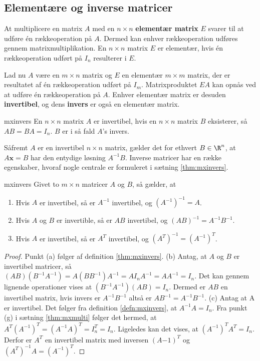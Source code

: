 \subsection{Elementære og inverse matricer}
At multiplicere en matrix $A$ med en $n \times n$ \textbf{elementær matrix} $E$ svarer til at udføre én rækkeoperation på $A$. 
Dermed kan enhver rækkeoperation udføres gennem matrixmultiplikation. 
En $n \times n$ matrix $E$ er elementær, hvis én rækkeoperation udført på $I_n$ resulterer i $E$. 

Lad nu $A$ være en $m \times n$ matrix og $E$ en elementær $m \times m$ matrix, der er resultatet af én rækkeoperation udført på $I_m$. 
Matrixproduktet $EA$ kan opnås ved at udføre én rækkeoperation på $A$. 
Enhver elementær matrix er desuden \textbf{invertibel}, og dens \textbf{invers} er også en elementær matrix. 
%
\begin{defn}{}{mxinvers}
En $n \times n$ matrix $A$ er invertibel, hvis en $n \times n$ matrix $B$ eksisterer, så $AB=BA=I_n$. $B$ er i så fald $A$'s invers. 
\end{defn}
Såfremt $A$ er en invertibel $n \times n$ matrix, gælder det for ethvert $B \in \R^n$, at $A\textbf{x}=B$ har den entydige løsning $A^{-1}B$. 
%
Inverse matricer har en række egenskaber, hvoraf nogle centrale er formuleret i sætning \ref{thm:mxinvers}. 
%
\begin{thm}{}{mxinvers}
Givet to $m \times n$ matricer $A$ og $B$, så gælder, at
\begin{enumerate}[label=(\alph*)]
\item Hvis $A$ er invertibel, så er $A^{-1}$ invertibel, og $(A^{-1})^{-1}=A$.
\item Hvis $A$ og $B$ er invertible, så er $AB$ invertibel, og $(AB)^{-1}=A^{-1}B^{-1}$.
\item Hvis $A$ er invertibel, så er $A^T$ invertibel, og $(A^T)^{-1}=(A^{-1})^T$.
\end{enumerate}
\end{thm}
%
%
\begin{proof}
Punkt (a) følger af definition \ref{thm:mxinvers}. 
(b) Antag, at $A$ og $B$ er invertibel matricer, så $(AB)(B^{-1}A^{-1})=A(BB^{-1})A^{-1}=AI_nA^{-1}=AA^{-1}=I_n$. 
Det kan gennem lignende operationer vises at $(B^{-1}A^{-1})(AB)=I_n$.
Dermed er $AB$ en invertibel matrix, hvis invers er $A^{-1}B^{-1}$ altså er $AB^{-1}=A^{-1}B^{-1}$.
(c) Antag at A er invertibel. 
Det følger fra definition \ref{defn:mxinvers}, at $A^{-1}A=I_n$. 
Fra punkt (g) i sætning \ref{thm:mxmulti} følger det hermed, at $A^T(A^{-1})^T=(A^{-1}A)^T=I_n^T=I_n$. 
Ligeledes kan det vises, at $(A^{-1})^TA^T=I_n$. 
Derfor er $A^T$ en invertibel matrix med inversen $(A{-1})^T$ og $(A^T)^{-1}A=(A^{-1})^T$.
\end{proof}
